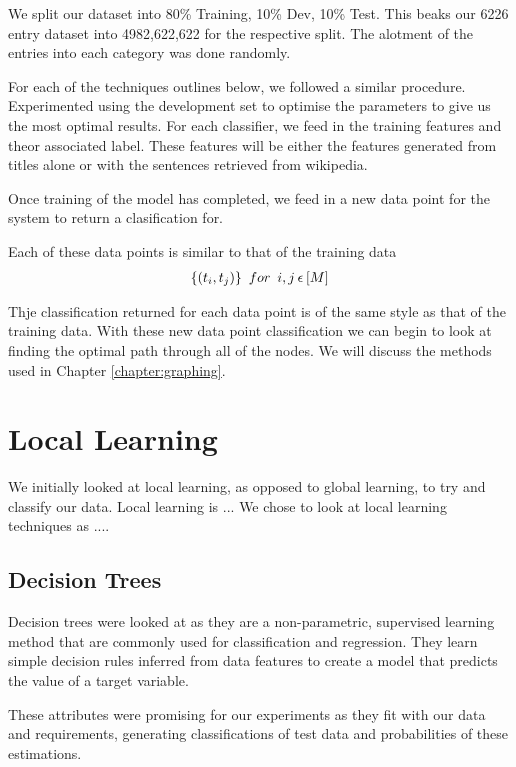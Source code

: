 \documentclass[bsc,frontabs,twoside,singlespacing,parskip,deptreport]{infthesis}     %
\begin{document}
We split our dataset into 80\% Training, 10\% Dev, 10\% Test. This beaks our 6226 entry dataset into 4982,622,622 for the respective split.
The alotment of the entries into each category was done randomly.

For each of the techniques outlines below, we followed a similar procedure.
Experimented using the development set to optimise the parameters to give us the most optimal results.
For each classifier, we feed in the training features and theor associated label. These features will
be either the features generated from titles alone or with the sentences retrieved from wikipedia.

Once training of the model has completed, we feed in a new data point for the system to return a clasification for.

Each of these data points is similar to that of the training data
 \begin{eqnarray}
   \{(t_{i},t_{j})\} \hspace{0.5em} for \hspace{0.5em} i,j \hspace{0.2em}\epsilon \hspace{0.2em}[M]\nonumber
 \end{eqnarray}

 Thje classification returned for each data point is of the same style as that of the training data.
 With these new data point classification we can begin to look at finding the optimal path through all of the nodes.
 We will discuss the methods used in Chapter \ref{chapter:graphing}.
 


\section{Local Learning}
We initially looked at local learning, as opposed to global learning, to try and classify our data.
Local learning is ...
We chose to look at local learning techniques as .... 
\subsection{Decision Trees}
Decision trees were looked at as they are a non-parametric, supervised learning method
that are commonly used for classification and regression. They learn simple decision rules inferred from
data features to create a model that predicts the value of a target variable.

These attributes were promising for our experiments as they fit with our data and requirements, generating
classifications of test data and probabilities of these estimations.
\end{document}
